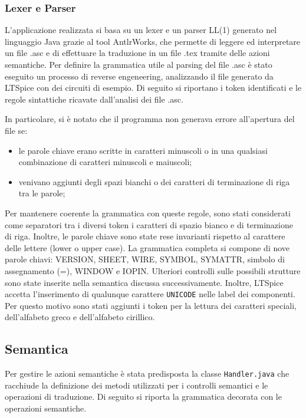 \subsubsection{Lexer e Parser}
L'applicazione realizzata si basa su un lexer e un parser LL(1) generato nel linguaggio Java grazie al tool AntlrWorks, che permette di leggere ed interpretare un file .asc e di effettuare la traduzione in un file .tex tramite delle azioni semantiche. Per definire la grammatica utile al parsing del file .asc è stato eseguito un processo di reverse engeneering, analizzando il file generato da LTSpice con dei circuiti di esempio. Di seguito si riportano i token identificati e le regole sintattiche ricavate dall'analisi dei file .asc.

In particolare, si è notato che il programma non generava errore all'apertura del file se:
\begin{itemize}
	\item le parole chiave erano scritte in caratteri minuscoli o in una qualsiasi combinazione di caratteri minuscoli e maiuscoli;
	\item venivano aggiunti degli spazi bianchi o dei caratteri di terminazione di riga tra le parole;
\end{itemize}
Per mantenere coerente la grammatica con queste regole, sono stati considerati come separatori tra i diversi token i caratteri di spazio bianco e di terminazione di riga. Inoltre, le parole chiave sono state rese invarianti rispetto al carattere delle lettere (lower o upper case). La grammatica completa si compone di nove parole chiavi: VERSION, SHEET, WIRE, SYMBOL, SYMATTR, simbolo di assegnamento (=), WINDOW e IOPIN. Ulteriori controlli sulle possibili strutture sono state inserite nella semantica discussa successivamente. Inoltre, LTSpice accetta l'inserimento di qualunque carattere \texttt{UNICODE} nelle label dei componenti. Per questo motivo sono stati aggiunti i token per la lettura dei caratteri speciali, dell'alfabeto greco e dell'alfabeto cirillico.

\subsection{Semantica}
Per gestire le azioni semantiche è stata predisposta la classe \texttt{Handler.java} che racchiude la definizione dei metodi utilizzati per i controlli semantici e le operazioni di traduzione. Di seguito si riporta la grammatica decorata con le operazioni semantiche.


